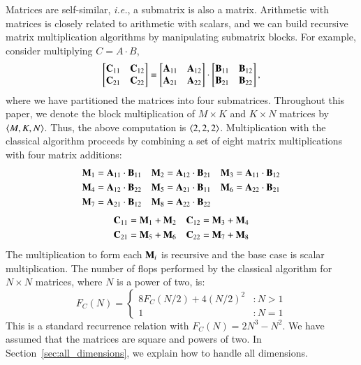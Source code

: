 \documentclass[preprint]{sigplanconf}
\newcommand{\M}[2][]{{\bm{#1\mathbf{\MakeUppercase{#2}}}}}
\begin{document}
Matrices are self-similar, \emph{i.e.}, a submatrix is also a matrix.
Arithmetic with matrices is closely related to arithmetic with scalars, and
we can build recursive matrix multiplication algorithms by manipulating submatrix blocks.
For example, consider multiplying $C = A \cdot B$,
\[
\begin{bmatrix}
\M{C}_{11} & \M{C}_{12} \\
\M{C}_{21} & \M{C}_{22}
\end{bmatrix} = 
\begin{bmatrix}
\M{A}_{11} & \M{A}_{12} \\
\M{A}_{21} & \M{A}_{22}
\end{bmatrix} \cdot
\begin{bmatrix}
\M{B}_{11} & \M{B}_{12} \\
\M{B}_{21} & \M{B}_{22}
\end{bmatrix},
\]
where we have partitioned the matrices into four submatrices.
Throughout this paper, we denote the block multiplication of $M \times K$ and $K \times N$ matrices by $\left\langle M, K, N\right\rangle$.
Thus, the above computation is $\left\langle2, 2, 2\right\rangle$.
Multiplication with the classical algorithm proceeds by combining a set of eight matrix multiplications with four matrix additions:
\begin{align*}
\M{M}_1 &= \M{A}_{11} \cdot \M{B}_{11}  & \M{M}_2 &= \M{A}_{12} \cdot \M{B}_{21} & \M{M}_3 &= \M{A}_{11} \cdot \M{B}_{12} \\
\M{M}_4 &= \M{A}_{12} \cdot \M{B}_{22} & \M{M}_5 &= \M{A}_{21} \cdot \M{B}_{11} & \M{M}_6 &= \M{A}_{22} \cdot \M{B}_{21} \\
\M{M}_7 &= \M{A}_{21} \cdot \M{B}_{12} & \M{M}_8 &= \M{A}_{22} \cdot \M{B}_{22}
\end{align*}
\vspace{-0.7cm} \begin{align*}
\M{C}_{11} &= \M{M}_1 + \M{M}_2 & \M{C}_{12} &= \M{M}_3 + \M{M}_4 \\
\M{C}_{21} &= \M{M}_5 + \M{M}_6  & \M{C}_{22} &= \M{M}_7 + \M{M}_8
\end{align*}
The multiplication to form each $\M{M}_i$ is recursive and the base case is scalar multiplication.
The number of flops performed by the classical algorithm for $N \times N$ matrices, where $N$ is a power of two, is:
\[
   F_C(N) = \left\{
     \begin{array}{lr}
       8F_C(N / 2) + 4(N / 2)^2 & : N > 1 \\
       1 & : N = 1
     \end{array}
   \right.
\]
This is a standard recurrence relation with $F_C(N) = 2N^3 -N^2$.
We have assumed that the matrices are square and powers of two.
In Section~\ref{sec:all_dimensions}, we explain how to handle all dimensions.
\end{document}
